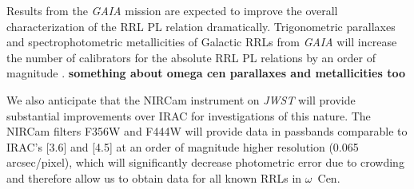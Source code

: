 \documentclass[a4paper,fleqn,usenatbib]{mnras}
\begin{document}
Results from the {\em GAIA} mission \citep{1996A&AS..116..579L} are expected to improve the overall characterization of the RRL PL relation dramatically. Trigonometric parallaxes and spectrophotometric metallicities of Galactic RRLs from {\em GAIA} will increase the number of calibrators for the absolute RRL PL relations by an order of magnitude \citep[{\bf overview paper}]{2012MNRAS.426.2463L}. {\bf something about omega cen parallaxes and metallicities too}

We also anticipate that the NIRCam instrument on {\em JWST} \citep{2005SPIE.5904...21B, 2006SSRv..123..485G} will provide substantial improvements over IRAC for investigations of this nature. The NIRCam filters F356W and F444W will provide data in passbands comparable to IRAC's [3.6] and [4.5] at an order of magnitude higher resolution (0.065 arcsec/pixel), which will significantly decrease photometric error due to crowding and therefore allow us to obtain data for all known RRLs in $\omega$~Cen. 

\end{document}
